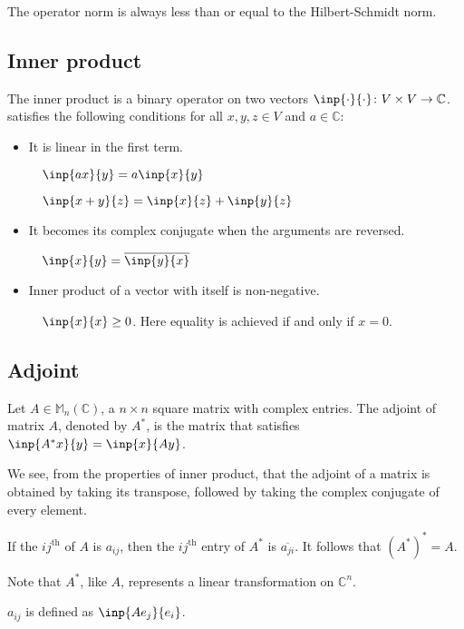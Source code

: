 \documentclass[twofold]{article}
\newcommand*\conj[1]{\overline{#1}}
\newcommand*\adj[1]{#1^*}
\theoremstyle{plain}
\theoremstyle{definition}
\begin{document}
The operator norm is always less than or equal to the Hilbert-Schmidt norm.

\subsection{Inner product}

The inner product is a binary operator on two vectors \(\inp{\cdot}{\cdot} \colon V  \times  V \to \mathbb{C}\).  satisfies the following conditions for all \(x, y, z \in V\) and \(a \in \mathbb{C}\):

\begin{itemize}
\item It is linear in the first term. 

\(\quad \inp{ax}{y} = a \inp{x}{y}\)
 
\(\quad \inp{x + y}{z} = \inp{x}{z} + \inp{y}{z}\)

\item It becomes its complex conjugate when the arguments are reversed.

\(\quad \inp{x}{y} = \conj{\inp{y}{x}}\)

\item Inner product of a vector with itself is non-negative. 

\(\quad \inp{x}{x} \ge 0\). Here equality is achieved if and only if \(x = 0\).
\end{itemize}



\subsection{Adjoint}

Let \(A \in \mathbb{M}_n (\mathbb{C})\),  a \(n \times n\) square matrix with complex entries. The adjoint of matrix \(A\), denoted by \(\adj{A}\), is the matrix that  satisfies \(\inp{\adj{A}x}{y} = \inp{x}{Ay}\). 

We see, from the properties of inner product, that the adjoint of a matrix is obtained by taking its transpose, followed by taking the complex conjugate of every element. 

If the \(ij^{\text{th}} \) of \(A\) is \(a_{ij}\), then the \(ij^{\text{th}}\) entry of \(\adj{A}\) is \(\conj{a_{ji}}\). It follows that \(\adj{(\adj{A})} = A\).

Note that \(\adj{A}\), like \(A\), represents a linear transformation on \(\mathbb{C}^n\).

\(a_{ij}\) is defined as \(\inp{Ae_j}{e_i}\).
\end{document}
